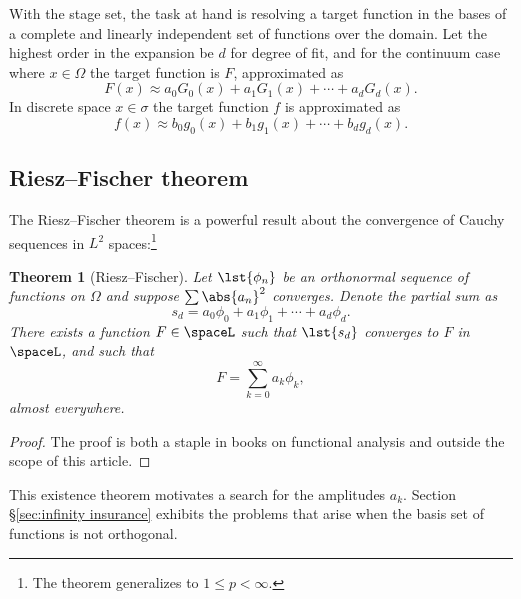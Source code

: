 \documentclass[conference]{worldcomp}
\begin{document}
With the stage set, the task at hand is resolving a target function in the bases of a complete and linearly independent set of functions over the domain. Let the highest order in the expansion be $d$ for degree of fit, and for the continuum case where $x\in\Omega$ the target function is  $F$, approximated as
  \begin{equation}
    F(x) \approx a_{0}G_{0}(x) + a_{1}G_{1}(x) + \cdots + a_{d}G_{d}(x) .
    \label{eq:approx F}
  \end{equation}
In discrete space $x\in\sigma$ the target function $f$ is approximated as
  \begin{equation}
    f(x) \approx b_{0}g_{0}(x) + b_{1}g_{1}(x) + \cdots + b_{d}g_{d}(x) .
    \label{eq:approx G}
  \end{equation}

\subsection{Riesz--Fischer theorem}  %

The Riesz--Fischer theorem \cite[p. 330]{Rudin} is a powerful result about the convergence of Cauchy sequences in $L^{2}$ spaces:\footnote{The theorem generalizes to $1\le p<\infty$.} %
%
\newtheorem{theorem}{Theorem}
\begin{theorem}[Riesz--Fischer]
Let $\lst{\phi_{n}}$ be an orthonormal sequence of functions on $\Omega$ and suppose $\sum \abs{a_{n}}^{2}$ converges. Denote the partial sum as
  \begin{equation*}
    s_{d} = a_{0}\phi_{0} + a_{1}\phi_{1} + \cdots + a_{d}\phi_{d} .
  \end{equation*}
There exists a function $F\in\spaceL$ such that $\lst{s_{d}}$ converges to $F$ in $\spaceL$, and such that
  \begin{equation}
    F = \sum_{k=0}^{\infty} a_{k}\phi_{k},
  \end{equation}
almost everywhere.
\end{theorem}
%
\begin{proof}
The proof is both a staple in books on functional analysis and outside the scope of this article.
\end{proof}

This existence theorem  motivates a search for the amplitudes $a_{k}$. Section \S \ref{sec:infinity insurance} exhibits the problems that arise when the basis set of functions is not orthogonal.
\end{document}
